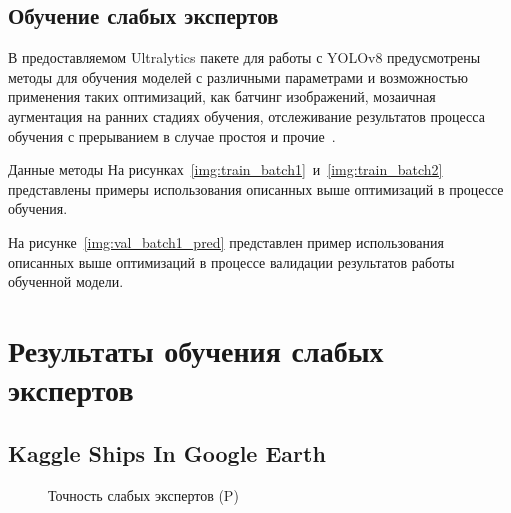 \subsection{Обучение слабых экспертов}

В предоставляемом Ultralytics пакете для работы с YOLOv8 предусмотрены методы для обучения моделей с различными параметрами и возможностью применения таких оптимизаций, как батчинг изображений, мозаичная аугментация на ранних стадиях обучения, отслеживание результатов процесса обучения с прерыванием в случае простоя и прочие~\cite{pkg-ultralytics}.

Данные методы
На рисунках~\ref{img:train_batch1}~и~\ref{img:train_batch2} представлены примеры использования описанных выше оптимизаций в процессе обучения.



На рисунке~\ref{img:val_batch1_pred} представлен пример использования описанных выше оптимизаций в процессе валидации результатов работы обученной модели.


\section{Результаты обучения слабых экспертов}

\subsection*{Kaggle Ships In Google Earth}


\begin{figure}[htp]
	\centering
	\captionsetup{justification=centering}
	\caption{Точность слабых экспертов (P)}
	\label{plt:precision}
\end{figure}

